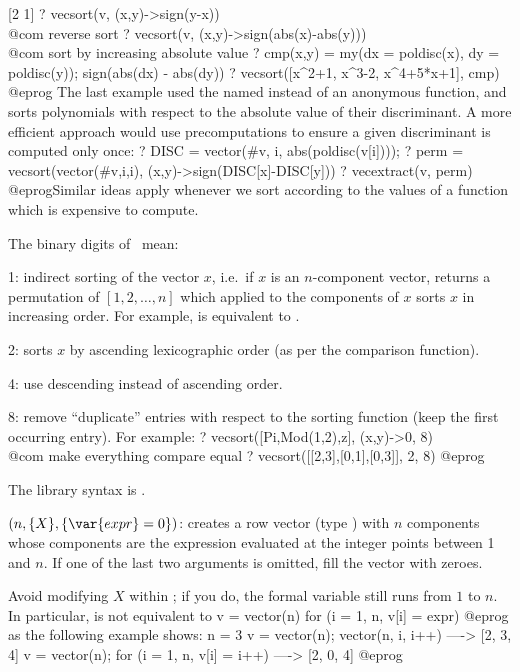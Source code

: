 [2 1]
? vecsort(v, (x,y)->sign(y-x))            \\@com reverse sort
? vecsort(v, (x,y)->sign(abs(x)-abs(y)))  \\@com sort by increasing absolute value
? cmp(x,y) = my(dx = poldisc(x), dy = poldisc(y)); sign(abs(dx) - abs(dy))
? vecsort([x^2+1, x^3-2, x^4+5*x+1], cmp)
@eprog\noindent
The last example used the named  instead of an anonymous function,
and sorts polynomials with respect to the absolute value of their
discriminant. A more efficient approach would use precomputations to ensure
a given discriminant is computed only once:
\bprog
? DISC = vector(#v, i, abs(poldisc(v[i])));
? perm = vecsort(vector(#v,i,i), (x,y)->sign(DISC[x]-DISC[y]))
? vecextract(v, perm)
@eprog\noindent Similar ideas apply whenever we sort according to the values
of a function which is expensive to compute.

\noindent The binary digits of \fl\ mean:

\item 1: indirect sorting of the vector $x$, i.e.~if $x$ is an
$n$-component vector, returns a permutation of $[1,2,\dots,n]$ which
applied to the components of $x$ sorts $x$ in increasing order.
For example,  is equivalent to
.

\item 2: sorts $x$ by ascending lexicographic order (as per the
 comparison function).

\item 4: use descending instead of ascending order.

\item 8: remove ``duplicate'' entries with respect to the sorting function
(keep the first occurring entry).  For example:
\bprog
  ? vecsort([Pi,Mod(1,2),z], (x,y)->0, 8)   \\@com make everything compare equal
  ? vecsort([[2,3],[0,1],[0,3]], 2, 8)
@eprog

The library syntax is .

$(n,\{X\},\{\var{expr}=0\})$: \label{se:vector}creates a row vector (type
) with $n$ components whose components are the expression
 evaluated at the integer points between 1 and $n$. If one of the
last two arguments is omitted, fill the vector with zeroes.

Avoid modifying $X$ within ; if you do, the formal variable
still runs from $1$ to $n$. In particular,  is not
equivalent to
\bprog
v = vector(n)
for (i = 1, n, v[i] = expr)
@eprog\noindent
as the following example shows:
\bprog
n = 3
v = vector(n); vector(n, i, i++)            ----> [2, 3, 4]
v = vector(n); for (i = 1, n, v[i] = i++)   ----> [2, 0, 4]
@eprog\noindent

